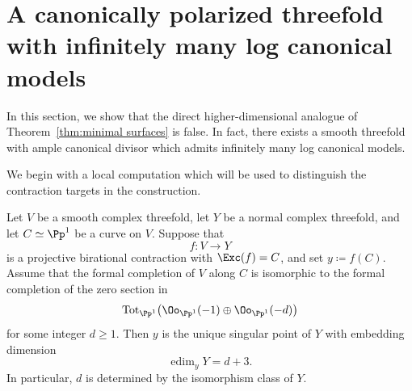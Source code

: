 \documentclass[12pt]{amsart}
\newcommand{\edim}{\operatorname{edim}}
\newcommand{\Tot}{\operatorname{Tot}}
\begin{document}
\section{A canonically polarized threefold with infinitely many log canonical models}\label{sec:threefold}

In this section, we show that the direct higher-dimensional analogue
of Theorem~\ref{thm:minimal surfaces} is false. In fact, there exists a smooth threefold with ample canonical divisor which admits infinitely many log canonical models.

We begin with a local computation which will be used to distinguish the contraction targets in the construction. 

\begin{lemma}\label{lem:embedding-dimension}
Let $V$ be a smooth complex threefold, let $Y$ be a normal complex threefold, and let $C\simeq\Pp^1$ be a curve on $V$. Suppose that
\[
 f\colon V\to Y
\]
is a projective birational contraction with $\Exc(f)=C$, and set $y\coloneqq f(C)$. Assume that the formal completion of $V$ along $C$ is isomorphic to the formal completion of the zero section in
\[
 \Tot_{\Pp^1}\bigl(\Oo_{\Pp^1}(-1)\oplus\Oo_{\Pp^1}(-d)\bigr)
\]
for some integer $d\geq1$. Then $y$ is the unique singular point of $Y$ with embedding dimension
\[
 \edim_yY=d+3.
\]
In particular, $d$ is determined by the isomorphism class of $Y$.
\end{lemma}
\end{document}
